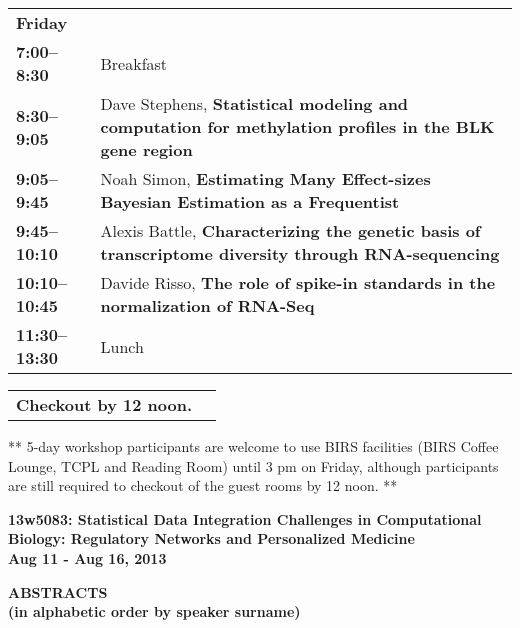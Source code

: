 \documentclass[11pt]{article}
\begin{document}
\begin{tabular}{ p{1in} p{5.8in} } 
{\bf\large Friday} & \\

{\bf 7:00--8:30}  & Breakfast\\
{\bf 8:30--9:05} & Dave Stephens, {\bf Statistical modeling and computation for methylation profiles in the BLK gene region}\\
{\bf 9:05--9:45} & Noah Simon, {\bf Estimating Many Effect-sizes Bayesian Estimation as a Frequentist}\\
{\bf 9:45--10:10} & Alexis Battle, {\bf Characterizing the genetic basis of transcriptome diversity through RNA-sequencing}\\
{\bf 10:10--10:45} & Davide Risso, {\bf The role of spike-in standards in the normalization of RNA-Seq}\\
{\bf 11:30--13:30} & Lunch\\
\end{tabular}

\begin{tabular}{ p{1in} p{5.8in} } 
{\bf Checkout by 12 noon.} & \\
\end{tabular}

\bigskip
\noindent
** 5-day workshop participants are welcome to use BIRS facilities (BIRS Coffee Lounge, TCPL and Reading Room) until 3 pm on Friday, although participants are still required to checkout of the guest rooms by 12 noon. **

%
%

\newpage
\begin{center}

\Large{\bf 13w5083: Statistical Data Integration Challenges in Computational Biology: Regulatory Networks and Personalized Medicine}\\
\Large{\bf Aug 11 - Aug 16, 2013}\\
\end{center}

\medskip
\begin{center}
{\bf ABSTRACTS}\\
{\bf (in alphabetic order by speaker surname)}\\
\end{center}

%
%
\end{document}
